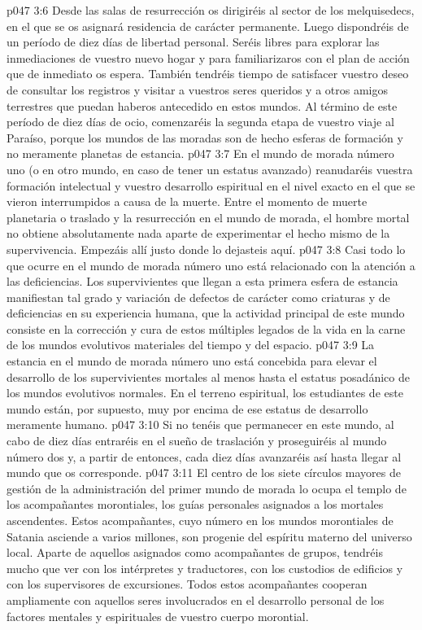 \vs p047 3:6 \pc Desde las salas de resurrección os dirigiréis al sector de los melquisedecs, en el que se os asignará residencia de carácter permanente. Luego dispondréis de un período de diez días de libertad personal. Seréis libres para explorar las inmediaciones de vuestro nuevo hogar y para familiarizaros con el plan de acción que de inmediato os espera. También tendréis tiempo de satisfacer vuestro deseo de consultar los registros y visitar a vuestros seres queridos y a otros amigos terrestres que puedan haberos antecedido en estos mundos. Al término de este período de diez días de ocio, comenzaréis la segunda etapa de vuestro viaje al Paraíso, porque los mundos de las moradas son de hecho esferas de formación y no meramente planetas de estancia.
\vs p047 3:7 \pc En el mundo de morada número uno (o en otro mundo, en caso de tener un estatus avanzado) reanudaréis vuestra formación intelectual y vuestro desarrollo espiritual en el nivel exacto en el que se vieron interrumpidos a causa de la muerte. Entre el momento de muerte planetaria o traslado y la resurrección en el mundo de morada, el hombre mortal no obtiene absolutamente nada aparte de experimentar el hecho mismo de la supervivencia. Empezáis allí justo donde lo dejasteis aquí.
\vs p047 3:8 Casi todo lo que ocurre en el mundo de morada número uno está relacionado con la atención a las deficiencias. Los supervivientes que llegan a esta primera esfera de estancia manifiestan tal grado y variación de defectos de carácter como criaturas y de deficiencias en su experiencia humana, que la actividad principal de este mundo consiste en la corrección y cura de estos múltiples legados de la vida en la carne de los mundos evolutivos materiales del tiempo y del espacio.
\vs p047 3:9 La estancia en el mundo de morada número uno está concebida para elevar el desarrollo de los supervivientes mortales al menos hasta el estatus posadánico de los mundos evolutivos normales. En el terreno espiritual, los estudiantes de este mundo están, por supuesto, muy por encima de ese estatus de desarrollo meramente humano.
\vs p047 3:10 Si no tenéis que permanecer en este mundo, al cabo de diez días entraréis en el sueño de traslación y proseguiréis al mundo número dos y, a partir de entonces, cada diez días avanzaréis así hasta llegar al mundo que os corresponde.
\vs p047 3:11 \pc El centro de los siete círculos mayores de gestión de la administración del primer mundo de morada lo ocupa el templo de los acompañantes morontiales, los guías personales asignados a los mortales ascendentes. Estos acompañantes, cuyo número en los mundos morontiales de Satania asciende a varios millones, son progenie del espíritu materno del universo local. Aparte de aquellos asignados como acompañantes de grupos, tendréis mucho que ver con los intérpretes y traductores, con los custodios de edificios y con los supervisores de excursiones. Todos estos acompañantes cooperan ampliamente con aquellos seres involucrados en el desarrollo personal de los factores mentales y espirituales de vuestro cuerpo morontial.
